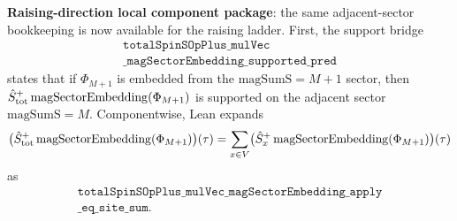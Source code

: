 \documentclass[a4paper,11pt]{article}
\begin{document}
\textbf{Raising-direction local component package}: the same
adjacent-sector bookkeeping is now available for the raising ladder.
First, the support bridge
\[
\begin{gathered}
\texttt{totalSpinSOpPlus\_mulVec}\\
\texttt{\_magSectorEmbedding\_supported\_pred}
\end{gathered}
\]
states that if \(\Phi_{M+1}\) is embedded from the
\(\mathrm{magSumS}=M+1\) sector, then
\(\hat S^+_{\rm tot}\,\mathrm{magSectorEmbedding}(\Phi_{M+1})\) is
supported on the adjacent sector \(\mathrm{magSumS}=M\).  Componentwise,
Lean expands
\[
  \bigl(\hat S^+_{\rm tot}\,\mathrm{magSectorEmbedding}(\Phi_{M+1})\bigr)(\tau)
  =
  \sum_{x\in V}
  \bigl(\hat S^+_x\,\mathrm{magSectorEmbedding}(\Phi_{M+1})\bigr)(\tau)
\]
as
\[
\begin{gathered}
\texttt{totalSpinSOpPlus\_mulVec\_magSectorEmbedding\_apply}\\
\texttt{\_eq\_site\_sum}.
\end{gathered}
\]
\end{document}
